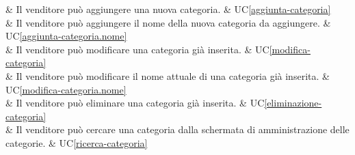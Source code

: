 & Il venditore può aggiungere una nuova categoria. & UC\ref{aggiunta-categoria} \\
    
 & Il venditore può aggiungere il nome della nuova categoria da aggiungere. & UC\ref{aggiunta-categoria.nome} \\
    
 & Il venditore può modificare una categoria già inserita. & UC\ref{modifica-categoria} \\
    
 & Il venditore può modificare il nome attuale di una categoria già inserita. & UC\ref{modifica-categoria.nome} \\
    
 & Il venditore può eliminare una categoria già inserita. & UC\ref{eliminazione-categoria} \\
    
 & Il venditore può cercare una categoria dalla schermata di amministrazione delle categorie. & UC\ref{ricerca-categoria} \\
